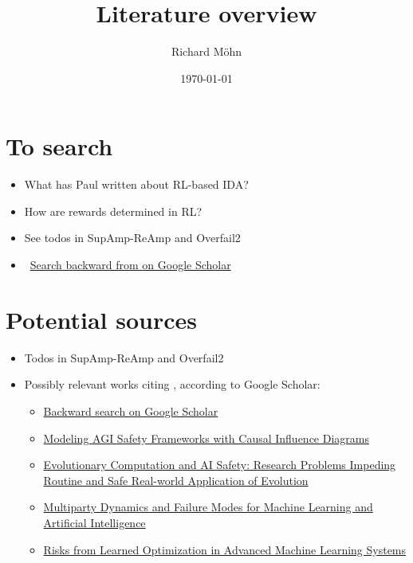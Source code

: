 \documentclass{farlamp}
\author{Richard Möhn}
\date{\today}
\title{Literature overview}
\begin{document}
\maketitle
\tableofcontents

\section{To search}

\begin{itemize}
    \item What has Paul written about RL-based IDA?
    \item How are rewards determined in RL?
    \item See todos in SupAmp-ReAmp and Overfail2
    \item \done\ \href{https://scholar.google.com/scholar?hl=en&as_sdt=0%2C5&q=supervising+strong+learners+by+amplifying+weak+experts&btnG=}{Search
        backward from \textcite{CSASupAmp} on Google Scholar}
\end{itemize}


\section{Potential sources}

\begin{itemize}
    \item Todos in SupAmp-ReAmp and Overfail2
    \item Possibly relevant works citing \textcite{CSASupAmp}, according to
        Google Scholar:
        \begin{itemize}
            \item \href{https://scholar.google.com/scholar?hl=en&as_sdt=0%2C5&q=supervising+strong+learners+by+amplifying+weak+experts&btnG=}{Backward search on Google Scholar}
            \item \href{https://arxiv.org/abs/1906.08663}{Modeling AGI Safety Frameworks
                with Causal Influence Diagrams}
            \item \href{https://arxiv.org/abs/1906.10189}{Evolutionary
                Computation and AI Safety: Research Problems Impeding Routine
                and Safe Real-world Application of Evolution}
            \item \href{https://www.mdpi.com/2504-2289/3/2/21}{Multiparty
                Dynamics and Failure Modes for Machine Learning and Artificial
                Intelligence}
            \item \href{https://arxiv.org/abs/1906.01820}{Risks from Learned Optimization in Advanced Machine Learning Systems}
        \end{itemize}
\end{itemize}
\end{document}
